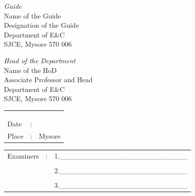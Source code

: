 \vfill
\begin{minipage}[t]{0.5\textwidth}%
\emph{Guide}\\
Name of the Guide\\
Designation of the Guide\\
Department of E\&C\\
SJCE, Mysore 570 006
\end{minipage}\hspace{2cm}
\begin{minipage}[t]{0.4\textwidth}%
{\emph{Head of the Department}}\\
Name of the HoD\\
Associate Professor and Head\\
Department of E\&C\\
SJCE, Mysore 570 006
\end{minipage}

\vfill
\begin{minipage}[t]{0.3\textwidth}%
\begin{tabular}{lcc}
 &  & \tabularnewline
 &  & \tabularnewline
 &  & \tabularnewline
Date & : & \tabularnewline
Place &: & Mysore\tabularnewline
\end{tabular}%
\end{minipage}\hspace{2cm}
\begin{minipage}[t]{0.4\textwidth}%
\noindent %
\begin{tabular}{ccr}
Examiners & :& 1.\_\_\_\_\_\_\_\_\_\_\_\_\_\_\_\_\_\_\_\_\_\_\_\_\_\\
&  & \\
&  & 2.\_\_\_\_\_\_\_\_\_\_\_\_\_\_\_\_\_\_\_\_\_\_\_\_\_\\
 &  & \\
&  & 3.\_\_\_\_\_\_\_\_\_\_\_\_\_\_\_\_\_\_\_\_\_\_\_\_\_\\
\end{tabular}%
\end{minipage}

